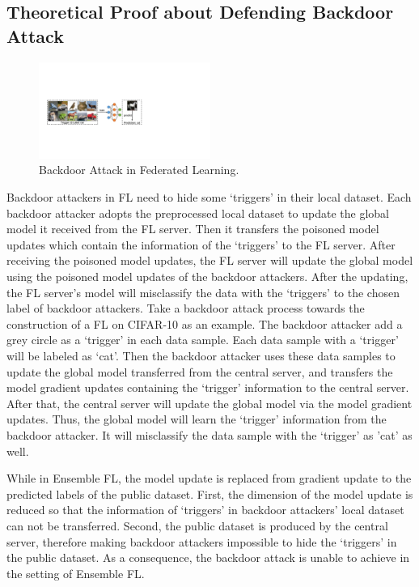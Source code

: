 \documentclass[journal]{IEEEtran}
\begin{document}
\subsection{Theoretical Proof about Defending Backdoor Attack}
\begin{figure}
  \centering
\includegraphics[width=0.5\textwidth]{figures/Figure_backdoor.pdf}
\caption{Backdoor Attack in Federated Learning.}
\label{fig_backdoor}
\end{figure}  
Backdoor attackers in FL need to hide some `triggers' in their local dataset. Each backdoor attacker adopts the preprocessed local dataset to update the global model it received from the FL server. Then it transfers the poisoned model updates which contain the information of the `triggers' to the FL server. After receiving the poisoned model updates, the FL server will update the global model using the poisoned model updates of the backdoor attackers. After the updating, the FL server's model will misclassify the data with the `triggers' to the chosen label of backdoor attackers. Take a backdoor attack process towards the construction of a FL on CIFAR-10 as an example. The backdoor attacker add a grey circle as a `trigger' in each data sample. Each data sample with a `trigger' will be labeled as `cat'. Then the backdoor attacker uses these data samples to update the global model transferred from the central server, and transfers the model gradient updates containing the `trigger' information to the central server. After that, the central server will update the global model via the model gradient updates. Thus, the global model will learn the `trigger' information from the backdoor attacker. It will misclassify the data sample with the `trigger' as 'cat' as well.
\par While in Ensemble FL, the model update is replaced from gradient update to the predicted labels of the public dataset. First, the dimension of the model update is reduced so that the information of `triggers' in backdoor attackers' local dataset can not be transferred. Second, the public dataset is produced by the central server, therefore making backdoor attackers impossible to hide the `triggers' in the public dataset. As a consequence, the backdoor attack is unable to achieve in the setting of Ensemble FL.
\end{document}
